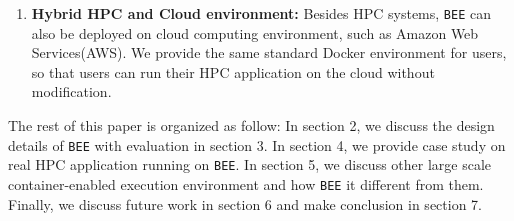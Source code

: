 \begin{enumerate}
\item \textbf{Hybrid HPC and Cloud environment:}
Besides HPC systems, \texttt{BEE} can also be deployed on cloud computing environment, such as Amazon Web Services(AWS). We provide the same standard Docker environment for users, so that users can run their HPC application on the cloud without modification.


\end{enumerate}

The rest of this paper is organized as follow: In section 2, we discuss the design details of \texttt{BEE} with evaluation in section 3. In section 4, we provide case study on real HPC application running on \texttt{BEE}. In section 5, we discuss other large scale container-enabled execution environment and how \texttt{BEE} it different from them. Finally, we discuss future work in section 6 and make conclusion in section 7.





